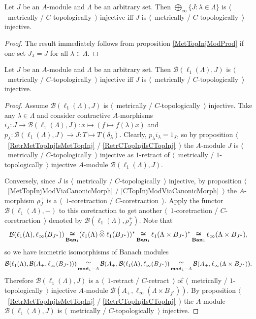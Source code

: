 \begin{corollary}\label{MetTopInjlInftySum} Let $J$ be an $A$-module and $\Lambda$ be an arbitrary set. Then $\bigoplus_\infty\{J:\lambda\in\Lambda\}$ is $\langle$~metrically / $C$-topologically~$\rangle$ injective iff $J$ is $\langle$~metrically / $C$-topologically~$\rangle$ injective.
\end{corollary}
\begin{proof} The result immediately follows from proposition \ref{MetTopInjModProd} if one set $J_\lambda=J$ for all $\lambda\in\Lambda$.
\end{proof}

\begin{proposition}\label{MapsFroml1toMetTopInj} Let $J$ be an $A$-module and $\Lambda$ be an arbitrary set. Then $\mathcal{B}(\ell_1(\Lambda),J)$ is $\langle$~metrically / $C$-topologically~$\rangle$ injective iff $J$ is $\langle$~metrically / $C$-topologically~$\rangle$ injective.
\end{proposition}
\begin{proof} 
Assume $\mathcal{B}(\ell_1(\Lambda), J)$ is $\langle$~metrically / $C$-topologically~$\rangle$ injective. Take any $\lambda\in\Lambda$ and consider contractive $A$-morphisms $i_\lambda:J\to\mathcal{B}(\ell_1(\Lambda),J):x\mapsto(f\mapsto f(\lambda)x)$ and $p_\lambda:\mathcal{B}(\ell_1(\Lambda),J)\to J:T\mapsto T(\delta_\lambda)$. Clearly, $p_\lambda i_\lambda=1_J$, so by proposition $\langle$~\ref{RetrMetTopInjIsMetTopInj} / \ref{RetrCTopInjIsCTopInj}~$\rangle$ the $A$-module $J$ is $\langle$~metrically / $C$-topologically~$\rangle$ injective as $1$-retract of $\langle$~metrically / $1$-topologically~$\rangle$ injective $A$-module $\mathcal{B}(\ell_1(\Lambda),J)$.

Conversely, since $J$ is $\langle$~metrically / $C$-topologically~$\rangle$ injective, by proposition $\langle$~\ref{MetTopInjModViaCanonicMorph} / \ref{CTopInjModViaCanonicMorph}~$\rangle$ the $A$-morphism $\rho_J^+$ is a $\langle$~$1$-coretraction / $C$-coretraction~$\rangle$. Apply the functor $\mathcal{B}(\ell_1(\Lambda),-)$ to this coretraction to get another $\langle$~$1$-coretraction / $C$-coretraction~$\rangle$ denoted by $\mathcal{B}(\ell_1(\Lambda),\rho_J^+)$. Note that 
$$
\mathcal{B}(\ell_1(\Lambda),\ell_\infty(B_{J^*}))\mathop{\mathbin{\cong}}\limits_{\mathbf{Ban}_1}(\ell_1(\Lambda)\mathbin{\widehat{\otimes}} \ell_1(B_{J^*}))^*\mathop{\mathbin{\cong}}\limits_{\mathbf{Ban}_1}\ell_1(\Lambda\times B_{J^*})^*\mathop{\mathbin{\cong}}\limits_{\mathbf{Ban}_1}\ell_\infty(\Lambda\times B_{J^*}),
$$ 
so we have isometric isomorphisms of Banach modules
$$
\mathcal{B}(\ell_1(\Lambda),\mathcal{B}(A_+,\ell_\infty(B_{J^*})))\mathop{\mathbin{\cong}}\limits_{\mathbf{mod}_1-A}\mathcal{B}(A_+,\mathcal{B}(\ell_1(\Lambda),\ell_\infty(B_{J^*}))\mathop{\mathbin{\cong}}\limits_{\mathbf{mod}_1-A}\mathcal{B}(A_+,\ell_\infty(\Lambda\times B_{J^*})).
$$ 
Therefore $\mathcal{B}(\ell_1(\Lambda),J)$ is a $\langle$~$1$-retract / $C$-retract~$\rangle$ of $\langle$~metrically / $1$-topologically~$\rangle$ injective $A$-module $\mathcal{B}(A_+,\ell_\infty(\Lambda\times B_{J^*}))$. By proposition $\langle$~\ref{RetrMetTopInjIsMetTopInj} / \ref{RetrCTopInjIsCTopInj}~$\rangle$ the $A$-module $\mathcal{B}(\ell_1(\Lambda), J)$ is $\langle$~metrically / $C$-topologically~$\rangle$ injective.
\end{proof}


